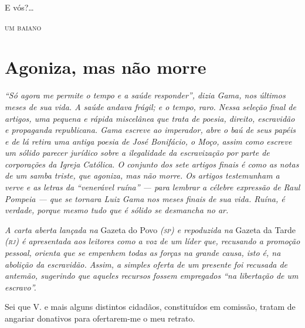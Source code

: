 {E vós?\ldots{}

\medskip
\hfill\textsc{um baiano}

\part{Agoniza, mas não morre}

\begin{didas}
\emph{``Só agora me permite o tempo e a saúde responder'', dizia Gama, nos
últimos meses de sua vida. A saúde andava frágil; e o tempo, raro. Nessa
seleção final de artigos, uma pequena e rápida miscelânea que trata de
poesia, direito, escravidão e propaganda republicana. Gama escreve ao
imperador, abre o baú de seus papéis e de lá retira uma antiga poesia de
José Bonifácio, o Moço, assim como escreve um sólido parecer jurídico
sobre a ilegalidade da escravização por parte de corporações
da Igreja Católica. O conjunto dos sete artigos finais é como as notas
de um samba triste, que agoniza, mas não morre. Os artigos testemunham a
verve e as letras da ``venerável ruína'' --- para lembrar a célebre
expressão de Raul Pompeia --- que se tornara Luiz Gama nos meses finais
de sua vida. Ruína, é verdade, porque mesmo tudo que é sólido se
desmancha no ar.}
\end{didas}



\begin{resumo}
\emph{A carta aberta lançada na} Gazeta do Povo \emph{(\textsc{sp}) e repoduzida
na} Gazeta da Tarde \emph{(\textsc{rj}) é apresentada aos leitores como a voz de
um líder que, recusando a promoção pessoal, orienta que se empenhem todas
as forças na grande causa, isto é, na abolição da escravidão. Assim, a
simples oferta de um presente foi recusada de antemão, sugerindo que
aqueles recursos fossem empregados ``na libertação de um escravo''. }
\end{resumo}

Sei que V. e mais alguns distintos cidadãos, constituídos em comissão, tratam de angariar donativos para ofertarem-me o meu retrato.

}

